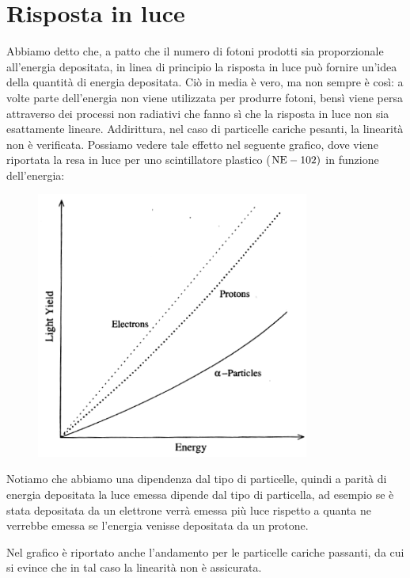 \section{Risposta in luce}

Abbiamo detto che, a patto che il numero di fotoni prodotti sia proporzionale all'energia depositata, in linea di principio la risposta in luce può fornire un'idea della quantità di energia depositata. Ciò in media è vero, ma non sempre è così: a volte parte dell'energia non viene utilizzata per produrre fotoni, bensì viene persa attraverso dei processi non radiativi che fanno sì che la risposta in luce non sia esattamente lineare. Addirittura, nel caso di particelle cariche pesanti, la linearità non è verificata. Possiamo vedere tale effetto nel seguente grafico, dove viene riportata la resa in luce per uno scintillatore plastico ($\rm NE-102)$ in funzione dell'energia:

\begin{minipage}{0.49\textwidth}
   \begin{figure}[H]
      \centering
      \includegraphics[width=0.8\textwidth]{immagini/risposta_in_luce.png}
   \end{figure}
\end{minipage}
\begin{minipage}{0.5\textwidth}
   \vspace{0.3cm}Notiamo che abbiamo una dipendenza dal tipo di particelle, quindi a parità di energia depositata la luce emessa dipende dal tipo di particella, ad esempio se è stata depositata da un elettrone verrà emessa più luce rispetto a quanta ne verrebbe emessa se l'energia venisse depositata da un protone.
   
   Nel grafico è riportato anche l'andamento per le particelle cariche passanti, da cui si evince che in tal caso la linearità non è assicurata.
\end{minipage}

